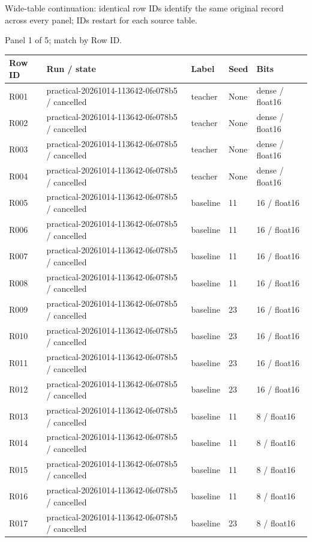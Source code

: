 \documentclass[10pt]{article}
\begin{document}
Wide-table continuation: identical row IDs identify the same original record across every panel; IDs restart for each source table.
\par\noindent Panel 1 of 5; match by Row ID.
{\scriptsize\setlength{\tabcolsep}{2pt}
\begin{longtable}{p{}p{}p{}p{}p{}}
Row ID & Run / state & Label & Seed & Bits \\
\hline\endhead
R001 & practical-20261014-113642-0fe078b5 / cancelled & teacher & None & dense / float16 \\
R002 & practical-20261014-113642-0fe078b5 / cancelled & teacher & None & dense / float16 \\
R003 & practical-20261014-113642-0fe078b5 / cancelled & teacher & None & dense / float16 \\
R004 & practical-20261014-113642-0fe078b5 / cancelled & teacher & None & dense / float16 \\
R005 & practical-20261014-113642-0fe078b5 / cancelled & baseline & 11 & 16 / float16 \\
R006 & practical-20261014-113642-0fe078b5 / cancelled & baseline & 11 & 16 / float16 \\
R007 & practical-20261014-113642-0fe078b5 / cancelled & baseline & 11 & 16 / float16 \\
R008 & practical-20261014-113642-0fe078b5 / cancelled & baseline & 11 & 16 / float16 \\
R009 & practical-20261014-113642-0fe078b5 / cancelled & baseline & 23 & 16 / float16 \\
R010 & practical-20261014-113642-0fe078b5 / cancelled & baseline & 23 & 16 / float16 \\
R011 & practical-20261014-113642-0fe078b5 / cancelled & baseline & 23 & 16 / float16 \\
R012 & practical-20261014-113642-0fe078b5 / cancelled & baseline & 23 & 16 / float16 \\
R013 & practical-20261014-113642-0fe078b5 / cancelled & baseline & 11 & 8 / float16 \\
R014 & practical-20261014-113642-0fe078b5 / cancelled & baseline & 11 & 8 / float16 \\
R015 & practical-20261014-113642-0fe078b5 / cancelled & baseline & 11 & 8 / float16 \\
R016 & practical-20261014-113642-0fe078b5 / cancelled & baseline & 11 & 8 / float16 \\
R017 & practical-20261014-113642-0fe078b5 / cancelled & baseline & 23 & 8 / float16 \\

\end{longtable}}
\end{document}
